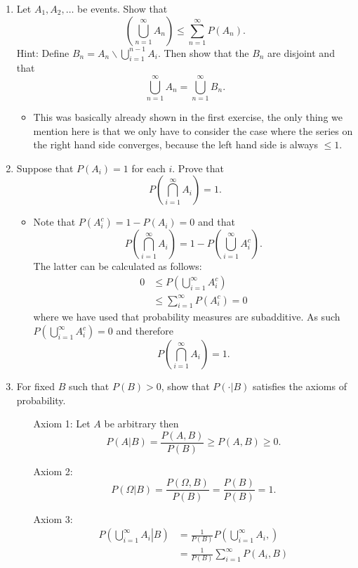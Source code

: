 \documentclass{article}
\begin{document}
\begin{enumerate}
\begin{itemize}
		\end{itemize}
	\item Let $A_1, A_2, \dots$ be events. Show that
	$$
	\left( \bigcup_{n = 1}^\infty A_n \right) \leq \sum_{n = 1}^\infty P(A_n).
	$$
	Hint: Define $B_n = A_n \backslash \bigcup_{i = 1}^{n - 1} A_i$. Then show that the $B_n$ are disjoint and that
	$$
	\bigcup_{n = 1}^\infty A_n = \bigcup_{n = 1}^\infty B_n.
	$$
	\begin{itemize}
		\item This was basically already shown in the first exercise, the only thing we mention here is that we only have to consider the case where the series on the right hand side converges, because the left hand side is always $\leq 1$.
	\end{itemize}
	\item Suppose that $P(A_i) = 1$ for each $i$. Prove that
	$$
	P\left( \bigcap_{i = 1}^\infty A_i \right) = 1.
	$$
		\begin{itemize}
			\item Note that $P(A_i^c) = 1 - P(A_i) = 0$ and that
			$$
			P\left( \bigcap_{i = 1}^\infty A_i \right) = 1 - P\left( \bigcup_{i = 1}^\infty A_i^c \right).
			$$
			The latter can be calculated as follows:
			$$
			\begin{aligned}
			0 &\leq P\left( \bigcup_{i = 1}^\infty A_i^c \right) \\
			&\leq \sum_{i = 1}^\infty P(A_i^c) = 0
			\end{aligned}
			$$
			where we have used that probability measures are subadditive. As such $P\left( \bigcup_{i = 1}^\infty A_i^c \right) = 0$ and therefore
			$$
			P\left( \bigcap_{i = 1}^\infty A_i \right) = 1.
			$$
		\end{itemize}
	\item For fixed $B$ such that $P(B) > 0$, show that $P(\cdot|B)$ satisfies the axioms of probability.
		\begin{itemize}
			\item[Axiom 1:] Let $A$ be arbitrary then
			$$
			P(A|B) = \frac{P(A, B)}{P(B)} \geq P(A, B) \geq 0.
			$$
			\item[Axiom 2:] $$P(\Omega|B) = \frac{P(\Omega, B)}{P(B)} = \frac{P(B)}{P(B)} = 1.$$
			\item[Axiom 3:]
			$$
			\begin{aligned}
			P\left(\left.\bigcup_{i = 1}^\infty A_i \right| B\right) &= \frac{1}{P(B)} P\left(\bigcup_{i = 1}^\infty A_i, \right) \\
			&= \frac{1}{P(B)} \sum_{i = 1}^\infty P(A_i, B) \\

\end{aligned}$$
\end{itemize}
\end{enumerate}
\end{document}

